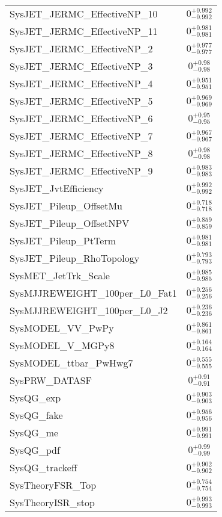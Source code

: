\begin{tabular}{|l|c|}
SysJET\_JERMC\_EffectiveNP\_10 & $0^{+0.992}_{-0.992}$ \\
SysJET\_JERMC\_EffectiveNP\_11 & $0^{+0.981}_{-0.981}$ \\
SysJET\_JERMC\_EffectiveNP\_2 & $0^{+0.977}_{-0.977}$ \\
SysJET\_JERMC\_EffectiveNP\_3 & $0^{+0.98}_{-0.98}$ \\
SysJET\_JERMC\_EffectiveNP\_4 & $0^{+0.951}_{-0.951}$ \\
SysJET\_JERMC\_EffectiveNP\_5 & $0^{+0.969}_{-0.969}$ \\
SysJET\_JERMC\_EffectiveNP\_6 & $0^{+0.95}_{-0.95}$ \\
SysJET\_JERMC\_EffectiveNP\_7 & $0^{+0.967}_{-0.967}$ \\
SysJET\_JERMC\_EffectiveNP\_8 & $0^{+0.98}_{-0.98}$ \\
SysJET\_JERMC\_EffectiveNP\_9 & $0^{+0.983}_{-0.983}$ \\
SysJET\_JvtEfficiency & $0^{+0.992}_{-0.992}$ \\
SysJET\_Pileup\_OffsetMu & $0^{+0.718}_{-0.718}$ \\
SysJET\_Pileup\_OffsetNPV & $0^{+0.859}_{-0.859}$ \\
SysJET\_Pileup\_PtTerm & $0^{+0.981}_{-0.981}$ \\
SysJET\_Pileup\_RhoTopology & $0^{+0.793}_{-0.793}$ \\
SysMET\_JetTrk\_Scale & $0^{+0.985}_{-0.985}$ \\
SysMJJREWEIGHT\_100per\_L0\_Fat1 & $0^{+0.256}_{-0.256}$ \\
SysMJJREWEIGHT\_100per\_L0\_J2 & $0^{+0.236}_{-0.236}$ \\
SysMODEL\_VV\_PwPy & $0^{+0.861}_{-0.861}$ \\
SysMODEL\_V\_MGPy8 & $0^{+0.164}_{-0.164}$ \\
SysMODEL\_ttbar\_PwHwg7 & $0^{+0.555}_{-0.555}$ \\
SysPRW\_DATASF & $0^{+0.91}_{-0.91}$ \\
SysQG\_exp & $0^{+0.903}_{-0.903}$ \\
SysQG\_fake & $0^{+0.956}_{-0.956}$ \\
SysQG\_me & $0^{+0.991}_{-0.991}$ \\
SysQG\_pdf & $0^{+0.99}_{-0.99}$ \\
SysQG\_trackeff & $0^{+0.902}_{-0.902}$ \\
SysTheoryFSR\_Top & $0^{+0.754}_{-0.754}$ \\
SysTheoryISR\_stop & $0^{+0.993}_{-0.993}$ \\

\end{tabular}
